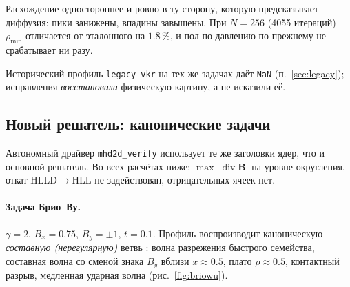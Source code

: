 \documentclass[12pt,a4paper]{article}
\newcommand{\divg}{\operatorname{div}}
\newcommand{\B}{\mathbf{B}}
\newcommand{\code}[1]{\texttt{#1}}
\begin{document}
\medskip
Расхождение одностороннее и ровно в ту сторону, которую предсказывает диффузия:
пики занижены, впадины завышены. При $N=256$ (4055 итераций) $\rho_{\min}$
отличается от эталонного на $1.8\,\%$, и пол по давлению по-прежнему не
срабатывает ни разу.

Исторический профиль \code{legacy\_vkr} на тех же задачах даёт \code{NaN}
(п.~\ref{sec:legacy}); исправления \emph{восстановили} физическую картину, а не
исказили её.

\subsection{Новый решатель: канонические задачи}
\label{sec:res-new}

Автономный драйвер \code{mhd2d\_verify} использует те же заголовки ядер, что и
основной решатель. Во всех расчётах ниже: $\max|\divg\B|$ на уровне округления,
откат HLLD$\to$HLL не задействован, отрицательных ячеек нет.

\paragraph{Задача Брио--Ву.}\label{sec:res-briowu}
$\gamma=2$, $B_x=0.75$, $B_y=\pm1$, $t=0.1$. Профиль воспроизводит каноническую
\emph{составную (нерегулярную)} ветвь \cite{brio1988,avdeeva2019}: волна
разрежения быстрого семейства, составная волна со сменой знака $B_y$ вблизи
$x\approx0.5$, плато $\rho\approx0.5$, контактный разрыв, медленная ударная
волна (рис.~\ref{fig:briowu}).
\end{document}
